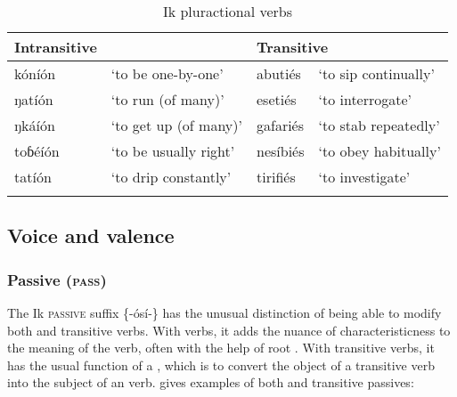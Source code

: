\begin{table}
\caption{Ik pluractional verbs}
\label{tab:verbs:pluract}


\begin{tabularx}{\textwidth}{XlXl}
\lsptoprule

Intransitive &  & \multicolumn{2}{X}{Transitive}\\
\midrule
kóníón & ‘to be one-by-one’ & abutiés & ‘to sip continually’\\
ŋatíón & ‘to run (of many)’ & esetiés & ‘to interrogate’\\
ŋkáíón & ‘to get up (of many)’ & gafariés & ‘to stab repeatedly’\\
toɓéíón & ‘to be usually right’ & nesíbiés & ‘to obey habitually’\\
tatíón & ‘to drip constantly’ & tirifiés & ‘to investigate’\\
\lspbottomrule
\end{tabularx}
\end{table}



\subsection{Voice and valence}\label{sec:8.6}
\subsubsection{Passive (\textsc{pass})}\label{sec:8.6.1}

The Ik \textsc{passive} suffix \{-ósí-\} has the unusual distinction of being able to modify both  and transitive verbs. With  verbs, it adds the nuance of characteristicness to the meaning of the verb, often with the help of root . With transitive verbs, it has the usual function of a , which is to convert the object of a transitive verb into the subject of an  verb.  gives examples of both  and transitive passives:


